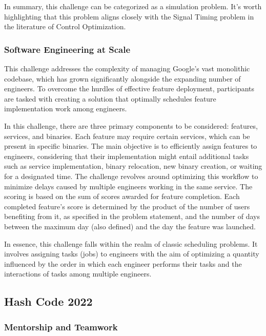 In summary, this challenge can be categorized as a simulation problem. It's
worth highlighting that this problem aligns closely with the Signal Timing
problem in the literature of Control Optimization.

\subsubsection*{Software Engineering at Scale}
\label{subsubsec:hashcode-2021-final}

This challenge addresses the complexity of managing Google's vast monolithic
codebase, which has grown significantly alongside the expanding number of
engineers. To overcome the hurdles of effective feature deployment, participants
are tasked with creating a solution that optimally schedules feature
implementation work among engineers.

In this challenge, there are three primary components to be considered: features,
services, and binaries. Each feature may require certain services, which can be
present in specific binaries. The main objective is to efficiently assign
features to engineers, considering that their implementation might entail
additional tasks such as service implementation, binary relocation, new binary
creation, or waiting for a designated time. The challenge revolves around
optimizing this workflow to minimize delays caused by multiple engineers working
in the same service. The scoring is based on the sum of scores awarded for
feature completion. Each completed feature's score is determined by the product
of the number of users benefiting from it, as specified in the problem
statement, and the number of days between the maximum day (also defined) and the
day the feature was launched.

In essence, this challenge falls within the realm of classic scheduling
problems. It involves assigning tasks (jobs) to engineers with the aim of
optimizing a quantity influenced by the order in which each engineer performs
their tasks and the interactions of tasks among multiple engineers.

\subsection{Hash Code 2022}
\label{subsec:hashcode-2022}

\subsubsection*{Mentorship and Teamwork}
\label{subsubsec:hashcode-2022-qualification}

